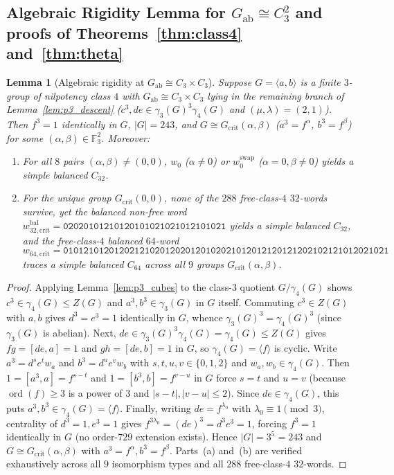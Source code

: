 \documentclass[11pt]{amsart}
\newtheorem{lemma}[theorem]{Lemma}
\theoremstyle{definition}
\theoremstyle{remark}
\newcommand{\F}{\mathbb{F}}
\newcommand{\ord}{\operatorname{ord}}
\begin{document}
\subsection{Algebraic Rigidity Lemma for $G_{\mathrm{ab}} \cong C_3^2$ and proofs of Theorems~\ref{thm:class4} and~\ref{thm:theta}}

\begin{lemma}[Algebraic rigidity at $G_{\mathrm{ab}} \cong C_3 \times C_3$]\label{lem:rigidity_crit}
Suppose $G = \langle a, b \rangle$ is a finite $3$-group of nilpotency class $4$ with $G_{\mathrm{ab}} \cong C_3 \times C_3$ lying in the remaining branch of Lemma~\ref{lem:p3_descent} ($c^3, de \in \gamma_3(G)^3 \gamma_4(G)$ and $(\mu,\lambda)=(2,1)$). Then $f^3 = 1$ identically in $G$, $|G| = 243$, and $G \cong G_{\mathrm{crit}}(\alpha, \beta)$ ($a^3 = f^\alpha$, $b^3 = f^\beta$) for some $(\alpha, \beta) \in \F_3^2$. Moreover:
\begin{enumerate}[label=(\alph*)]
\item For all $8$ pairs $(\alpha,\beta) \ne (0,0)$, $w_0$ ($\alpha \ne 0$) or $w_0^{\mathrm{swap}}$ ($\alpha=0, \beta \ne 0$) yields a simple balanced $C_{32}$.
\item For the unique group $G_{\mathrm{crit}}(0,0)$, none of the $288$ free-class-$4$ $32$-words survive, yet the balanced non-free word $w_{32,\mathrm{crit}}^{\mathrm{bal}} = \mathtt{02020101210120101021021012101021}$ yields a simple balanced $C_{32}$, and the free-class-$4$ balanced $64$-word
\[
w_{64,\mathrm{crit}} = \mathtt{0101210120120212102012020120102021012012120121202102121012021021}
\]
traces a simple balanced $C_{64}$ across all $9$ groups $G_{\mathrm{crit}}(\alpha,\beta)$.
\end{enumerate}
\end{lemma}

\begin{proof}
Applying Lemma~\ref{lem:p3_cubes} to the class-$3$ quotient $G/\gamma_4(G)$ shows $c^3 \in \gamma_4(G) \le Z(G)$ and $a^3, b^3 \in \gamma_3(G)$ in $G$ itself. Commuting $c^3 \in Z(G)$ with $a,b$ gives $d^3 = e^3 = 1$ identically in $G$, whence $\gamma_3(G)^3 = \gamma_4(G)^3$ (since $\gamma_3(G)$ is abelian). Next, $de \in \gamma_3(G)^3 \gamma_4(G) = \gamma_4(G) \le Z(G)$ gives $fg = [de,a] = 1$ and $gh = [de,b] = 1$ in $G$, so $\gamma_4(G) = \langle f \rangle$ is cyclic. Write $a^3 = d^s e^t w_a$ and $b^3 = d^u e^v w_b$ with $s,t,u,v \in \{0,1,2\}$ and $w_a, w_b \in \gamma_4(G)$. Then $1 = [a^3,a] = f^{s-t}$ and $1 = [b^3,b] = f^{v-u}$ in $G$ force $s=t$ and $u=v$ (because $\ord(f) \ge 3$ is a power of $3$ and $|s-t|,|v-u| \le 2$). Since $de \in \gamma_4(G)$, this puts $a^3, b^3 \in \gamma_4(G) = \langle f \rangle$. Finally, writing $de = f^{\lambda_0}$ with $\lambda_0 \equiv 1 \pmod 3$, centrality of $d^3=1, e^3=1$ gives $f^{3\lambda_0} = (de)^3 = d^3 e^3 = 1$, forcing $f^3 = 1$ identically in $G$ (no order-$729$ extension exists). Hence $|G| = 3^5 = 243$ and $G \cong G_{\mathrm{crit}}(\alpha,\beta)$ with $a^3=f^\alpha, b^3=f^\beta$. Parts~(a) and~(b) are verified exhaustively across all $9$ isomorphism types and all $288$ free-class-$4$ $32$-words.
\end{proof}
\end{document}

